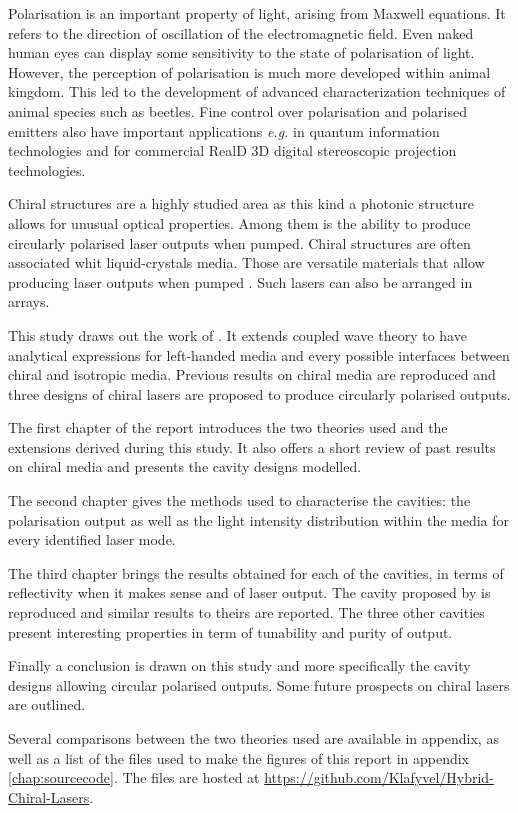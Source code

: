 
Polarisation is an important property of light, arising from Maxwell equations\cite{weir_optical_2019}. It refers to the direction of oscillation of the electromagnetic field. Even naked human eyes can display some sensitivity to the state of polarisation of light\cite{le_floch_polarisation_2010}. However, the perception of polarisation is much more developed within animal kingdom. This led to the development of advanced characterization techniques of animal species such as beetles\cite{carter_variation_2016}. Fine control over polarisation and polarised emitters also have important applications \textit{e.g.} in quantum information technologies\cite{bennett_quantum_2014} and for commercial RealD 3D digital
stereoscopic projection technologies\cite{mendiburu_chapter_2009}.

Chiral structures are a highly studied area\cites{belyakova_optical_2011}{harutyunyan_optical_2007}{mccall_simplified_2009}{mccall_properties_2009} as this kind a photonic structure allows for unusual optical properties. Among them is the ability to produce circularly polarised laser outputs when pumped\cites{topf_modes_2014}{kopp_twist_2002}{oldano_comment_2004}. Chiral structures are often associated whit liquid-crystals media. Those are versatile materials that allow producing laser outputs when pumped \cites{coles_liquid-crystal_2010}{gardiner_paintable_2011}. Such lasers can also be arranged in arrays\cite{hands_two-dimensional_2008}.

This study draws out the work of \textcite{topf_modes_2014}. It extends coupled wave theory to have analytical expressions for left-handed media and every possible interfaces between chiral and isotropic media. Previous results on chiral media are reproduced and three designs of chiral lasers are proposed to produce circularly polarised outputs.

The first chapter of the report introduces the two theories used and the extensions derived during this study. It also offers a short review of past results on chiral media and presents the cavity designs modelled.

The second chapter gives the methods used to characterise the cavities: the polarisation output as well as the light intensity distribution within the media for every identified laser mode.

The third chapter brings the results obtained for each of the cavities, in terms of reflectivity when it makes sense and of laser output. The cavity proposed by \textcite{topf_modes_2014} is reproduced and similar results to theirs are reported. The three other cavities present interesting properties in term of tunability and purity of output.

Finally a conclusion is drawn on this study and more specifically the cavity designs allowing circular polarised outputs. Some future prospects on chiral lasers are outlined.

Several comparisons between the two theories used are available in appendix, as well as a list of the files used to make the figures of this report in appendix \ref{chap:sourcecode}. The files are hosted at \url{https://github.com/Klafyvel/Hybrid-Chiral-Lasers}.